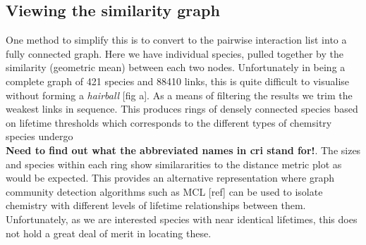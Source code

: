 \subsection{Viewing the similarity graph}

One method to simplify this is to convert to the pairwise interaction list into a fully connected graph. Here we have individual species, pulled together by the similarity (geometric mean) between each two nodes.
Unfortunately in being a complete graph of  421 species and 88410 links, this is quite difficult to visualise without forming a \emph{hairball} [fig a]. As a means of filtering the results we trim the weakest links in sequence. This produces rings of densely connected species based on lifetime thresholds which corresponds to the different types of chemsitry species undergo \\



\textbf{Need to find out what the abbreviated names in cri stand for!}. The sizes and species within each ring show similararities to the distance metric plot as would be expected. This provides an alternative representation where graph community detection algorithms such as MCL [ref] can be used to isolate chemistry with different levels of lifetime relationships between them. Unfortunately, as we are interested species with near identical lifetimes, this does not hold a great deal of merit in locating these. 


